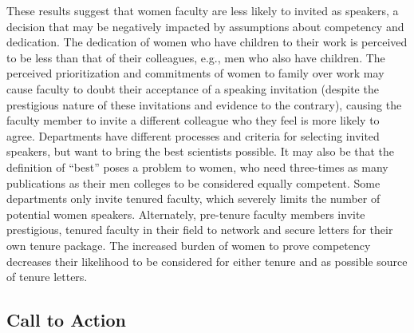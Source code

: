\documentclass[10pt,]{article}
\begin{document}
These results suggest that women faculty are less likely to invited as
speakers, a decision that may be negatively impacted by assumptions
about competency and dedication. The dedication of women who have
children to their work is perceived to be less than that of their
colleagues, e.g., men who also have children. The perceived
prioritization and commitments of women to family over work may cause
faculty to doubt their acceptance of a speaking invitation (despite the
prestigious nature of these invitations and evidence to the contrary),
causing the faculty member to invite a different colleague who they feel
is more likely to agree. Departments have different processes and
criteria for selecting invited speakers, but want to bring the best
scientists possible. It may also be that the definition of ``best''
poses a problem to women, who need three-times as many publications as
their men colleges to be considered equally competent. Some departments
only invite tenured faculty, which severely limits the number of
potential women speakers. Alternately, pre-tenure faculty members invite
prestigious, tenured faculty in their field to network and secure
letters for their own tenure package. The increased burden of women to
prove competency decreases their likelihood to be considered for either
tenure and as possible source of tenure letters.

\subsection{Call to Action}\label{call-to-action}
\end{document}
